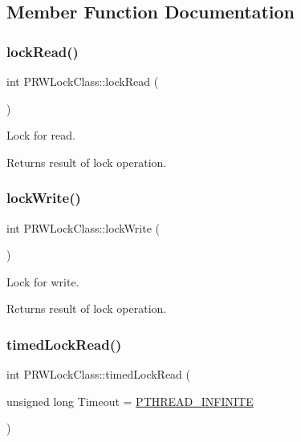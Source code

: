 \subsection{Member Function Documentation}
\mbox{\label{classPRWLockClass_a46653617ca027a5c1606cbe15024beda}} 
\subsubsection{\texorpdfstring{lock\+Read()}{lockRead()}}
{\footnotesize\ttfamily int P\+R\+W\+Lock\+Class\+::lock\+Read (\begin{DoxyParamCaption}{ }\end{DoxyParamCaption})\hspace{0.3cm}{\ttfamily [inline]}}

Lock for read. \begin{DoxyReturn}{Returns}
result of lock operation. 
\end{DoxyReturn}
\mbox{\label{classPRWLockClass_a685bacbde4d64ec46d2107c69707ff6a}} 
\subsubsection{\texorpdfstring{lock\+Write()}{lockWrite()}}
{\footnotesize\ttfamily int P\+R\+W\+Lock\+Class\+::lock\+Write (\begin{DoxyParamCaption}{ }\end{DoxyParamCaption})\hspace{0.3cm}{\ttfamily [inline]}}

Lock for write. \begin{DoxyReturn}{Returns}
result of lock operation. 
\end{DoxyReturn}
\mbox{\label{classPRWLockClass_aea260fd7b6edbed8f3e4ed45c5f2dd10}} 
\subsubsection{\texorpdfstring{timed\+Lock\+Read()}{timedLockRead()}}
{\footnotesize\ttfamily int P\+R\+W\+Lock\+Class\+::timed\+Lock\+Read (\begin{DoxyParamCaption}\item[{unsigned long}]{Timeout = {\ttfamily \hyperlink{PThreadClassLib_8h_a9d2d74d73cb5d069fbfcbcfebf42bd6e}{P\+T\+H\+R\+E\+A\+D\+\_\+\+I\+N\+F\+I\+N\+I\+TE}} }\end{DoxyParamCaption})}

